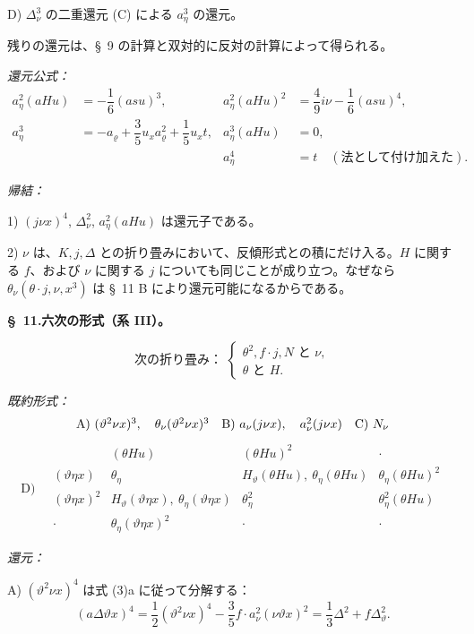 \documentclass[11pt]{jlreq}
\newcommand{\A}{\Delta}
\newcommand{\R}{\varrho}
\begin{document}
\noindent D) $\A_\nu^3$ の二重還元 (C) による $a_\eta^3$ の還元。

残りの還元は、\S\ 9 の計算と双対的に反対の計算によって得られる。

\noindent\emph{還元公式：}
\[
\tag{11}
\begin{array}{rl|rl}
a_\eta^2(aHu)&=-\dfrac16(asu)^3,&
 a_\eta^2(aHu)^2&=\dfrac49 i\nu-\dfrac16(asu)^4,\\[0.7em]
a_\eta^3&=-a_\R+\dfrac35u_xa_\R^2+\dfrac15u_xt,
& a_\eta^3(aHu)&=0,\\[0.7em]
&&a_\eta^4&=t\quad(\text{法として付け加えた}).
\end{array}
\]

\noindent\emph{帰結：}

1) $(j\nu x)^4$, $\A_\nu^2$, $a_\eta^2(aHu)$ は還元子である。

2) $\nu$ は、$K,j,\A$ との折り畳みにおいて、反傾形式との積にだけ入る。$H$ に関する $f$、および $\nu$ に関する $j$ についても同じことが成り立つ。なぜなら $\theta_\nu(\theta\cdot j,\nu,x^3)$ は \S\ 11 B により還元可能になるからである。

\begin{center}
\textbf{\S\ 11.\quad 六次の形式（系 III）。}
\end{center}
\[
\text{次の折り畳み： }\left\{\begin{array}{l}
\theta^2,
 f\cdot j,
 N \text{ と }\nu,\\
\theta\text{ と }H.
\end{array}\right.
\]

\noindent\emph{既約形式：}
\[
\begin{array}{c@{\quad}c@{\quad}c}
\text{A)}\ (\vartheta^2\nu x)^3,\quad \theta_\nu(\vartheta^2\nu x)^3
&
\text{B)}\ a_\nu(j\nu x),\quad a_\nu^2(j\nu x)
&
\text{C)}\ N_\nu
\end{array}
\]
\[
\text{D)}\quad
\begin{array}{c|c|c|c}
 & (\theta Hu)&(\theta Hu)^2&\cdot\\
(\vartheta\eta x)&\theta_\eta&H_\vartheta(\theta Hu),\ \theta_\eta(\theta Hu)&\theta_\eta(\theta Hu)^2\\
(\vartheta\eta x)^2&H_\vartheta(\vartheta\eta x),\ \theta_\eta(\vartheta\eta x)&\theta_\eta^2&\theta_\eta^2(\theta Hu)\\
\cdot&\theta_\eta(\vartheta\eta x)^2&\cdot&\cdot
\end{array}
\]

\noindent\emph{還元：}

\noindent A) $(\vartheta^2\nu x)^4$ は式 (3)a に従って分解する：
\[
(a\A\vartheta x)^4=\frac12(\vartheta^2\nu x)^4-\frac35 f\cdot a_\nu^2(\nu\vartheta x)^2
=\frac13\A^2+f\A_\vartheta^2.
\]
\end{document}
